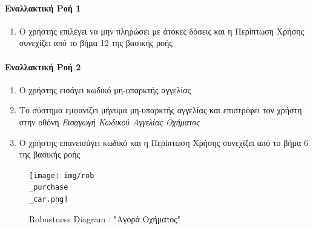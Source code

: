 \documentclass{../ol-softwaremanual}
\begin{document}
	\paragraph{Εναλλακτική Ροή 1}
	\begin{enumerate}
		\item Ο χρήστης επιλέγει να μην πληρώσει με άτοκες δόσεις και η Περίπτωση Χρήσης συνεχίζει από το βήμα 12 της βασικής ροής
	\end{enumerate}
	
	\paragraph{Εναλλακτική Ροή 2}
	\begin{enumerate}
		\item Ο χρήστης εισάγει κωδικό μη-υπαρκτής αγγελίας
		\item Το σύστημα εμφανίζει μήνυμα μη-υπαρκτής αγγελίας και επιστρέφει τον χρήστη στην οθόνη \textit{Εισαγωγή Κωδικού Αγγελίας Οχήματος} 
		\item Ο χρήστης επανεισάγει κωδικό και η Περίπτωση Χρήσης συνεχίζει από το βήμα 6 της βασικής ροής
	\end{enumerate}
	
	\begin{figure}[htbp!]
		\texttt{[image: img/rob\\\_purchase\\\_car.png]}
		\caption{\en Robustness Diagram : "\gr Αγορά Οχήματος\en"\gr}
	\end{figure}
	
	
	\newpage
	\centering
\end{document}
